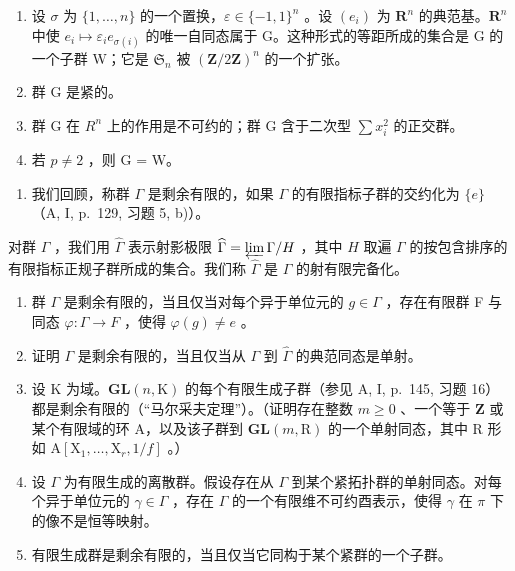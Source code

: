 \begin{enumerate}
\def\labelenumi{\alph{enumi})}
\item
  设 \(\sigma\) 为 \(\{1,\ldots,n\}\) 的一个置换，\(\varepsilon\in\{-1,1\}^{n}\) 。设 \((e_{i})\) 为 \(\mathbf{R}^{n}\) 的典范基。\(\mathbf{R}^{n}\) 中使 \(e_{i}\mapsto\varepsilon_{i}e_{\sigma(i)}\) 的唯一自同态属于 G。这种形式的等距所成的集合是 G 的一个子群 W；它是 \(\mathfrak{S}_{n}\) 被 \((\mathbf{Z}/2\mathbf{Z})^{n}\) 的一个扩张。
\item
  群 G 是紧的。
\item
  群 G 在 \(R^{n}\) 上的作用是不可约的；群 G 含于二次型 \(\sum x_{i}^{2}\) 的正交群。
\item
  若 \(p \neq 2\) ，则 G = W。
\end{enumerate}

\begin{enumerate}
\def\labelenumi{\arabic{enumi})}
\setcounter{enumi}{2}
\tightlist
\item
  我们回顾，称群 \(\Gamma\) 是剩余有限的，如果 \(\Gamma\) 的有限指标子群的交约化为 \(\{e\}\) （A, I, p.~129, 习题 5, b)）。
\end{enumerate}

对群 \(\Gamma\) ，我们用 \(\widehat{\Gamma}\) 表示射影极限 \(\widehat{\Gamma} = \varprojlim \Gamma / H\) ，其中 \(H\) 取遍 \(\Gamma\) 的按包含排序的有限指标正规子群所成的集合。我们称 \(\widehat{\Gamma}\) 是 \(\Gamma\) 的射有限完备化。

\begin{enumerate}
\def\labelenumi{\alph{enumi})}
\item
  群 \(\Gamma\) 是剩余有限的，当且仅当对每个异于单位元的 \(g \in \Gamma\) ，存在有限群 F 与同态 \(\varphi: \Gamma \to F\) ，使得 \(\varphi(g) \neq e\) 。
\item
  证明 \(\Gamma\) 是剩余有限的，当且仅当从 \(\Gamma\) 到 \(\widehat{\Gamma}\) 的典范同态是单射。
\item
  设 K 为域。\(\mathbf{GL}(n,\mathrm{K})\) 的每个有限生成子群（参见 A, I, p.~145, 习题 16）都是剩余有限的（“马尔采夫定理”）。（证明存在整数 \(m\geqslant 0\) 、一个等于 \(\mathbf{Z}\) 或某个有限域的环 A，以及该子群到 \(\mathbf{GL}(m,\mathrm{R})\) 的一个单射同态，其中 R 形如 \(\mathrm{A}[\mathrm{X}_1,\dots ,\mathrm{X}_r,1 / f]\) 。）
\item
  设 \(\Gamma\) 为有限生成的离散群。假设存在从 \(\Gamma\) 到某个紧拓扑群的单射同态。对每个异于单位元的 \(\gamma \in \Gamma\) ，存在 \(\Gamma\) 的一个有限维不可约酉表示，使得 \(\gamma\) 在 \(\pi\) 下的像不是恒等映射。
\item
  有限生成群是剩余有限的，当且仅当它同构于某个紧群的一个子群。
\end{enumerate}

